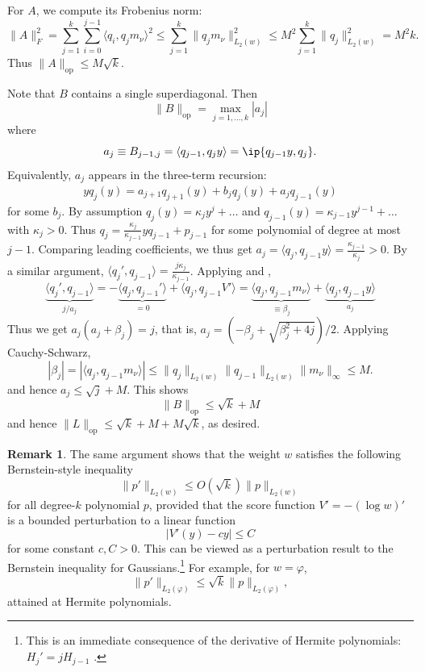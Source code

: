 \documentclass[letterpaper,11pt]{article}
\newcommand{\Iprod}[2]{\langle #1, #2 \rangle}
\theoremstyle{definition}
\newtheorem{remark}{Remark}
\newcommand{\op}{\mathrm{op}}
\begin{document}
    For $A$, we compute its Frobenius norm:
    \[
      \|A\|_F^2=
      \sum_{j=1}^k \sum_{i=0}^{j-1}
      \Iprod{q_i}{q_j m_\nu}^2
      \leq \sum_{j=1}^k \|q_j m_\nu\|_{L_2(w)}^2
      \leq M^2 \sum_{j=1}^k \| {q_j}\|_{L_2(w)}^2 = M^2 k.
    \]
    Thus $\|A\|_{\op} \leq M \sqrt{k}$.

    Note that $B$ contains a single superdiagonal. Then
    \[
      \|B\|_{\op} = \max_{j=1,\ldots,k} |a_j|
    \]
    where
    \[
      a_j \equiv B_{j-1,j} =
      \Iprod{q_{j-1}}{q_j y} = \ip{q_{j-1}y, q_j}.
    \]
    Equivalently, $a_j$ appears in the three-term recursion:
    \begin{align}
      y q_j(y) = a_{j+1} q_{j+1}(y)
      + b_j q_j(y) + a_j q_{j-1}(y)
    \end{align}
    for some $b_j$.
    By assumption
    $q_j(y)=\kappa_j y^j +\ldots$ and $q_{j-1}(y)=\kappa_{j-1} y^{j-1} +\ldots$ with
    $\kappa_j>0$. Thus $q_j = \frac{\kappa_j}{\kappa_{j-1}}y q_{j-1} + p_{j-1}$ for some
    polynomial of degree at most $j-1$.
    Comparing leading coefficients, we thus get
    $a_j =\Iprod{q_j }{q_{j-1} y}
    = \frac{\kappa_{j-1}}{\kappa_j}>0$.
    By a similar argument, $\Iprod{q_j'}{q_{j-1}} = \frac{j\kappa_j}{\kappa_{j-1}}$.
    Applying  and ,
    \[
      \underbrace{\Iprod{q_j'}{q_{j-1}}}_{j/a_j} =
      -\underbrace{\Iprod{q_j}{q_{j-1}'}}_{=0} +
      \Iprod{q_j }{q_{j-1} V'}
      = \underbrace{\Iprod{q_j }{q_{j-1} m_\nu}}_{\equiv \beta_j} + \underbrace{\Iprod{q_j }{q_{j-1}y}}_{a_j}
    \]
    Thus we get
    $a_j(a_j+\beta_j) = j$, that is,
    $a_j = (-\beta_j + \sqrt{\beta_j^2 + 4 j})/2$. Applying Cauchy-Schwarz,
    \[
      |\beta_j| = |\Iprod{q_j }{q_{j-1} m_\nu}| \leq
      \|q_j\|_{L_2(w)} \|q_{j-1}\|_{L_2(w)}
      \|m_\nu\|_\infty \leq M.
    \]
    and hence $a_j \leq \sqrt{j} + M$.
    This shows
    \[
      \|B\|_{\op} \leq \sqrt{k}+M
    \]
    and hence $\|L\|_{\op} \leq \sqrt{k}+M + M\sqrt{k}$, as desired.

    \begin{remark}
    \label{rmk:bernstein-perturb}
      The same argument shows that the weight $w$ satisfies the following Bernstein-style inequality
      \[
        \|p'\|_{L_2(w)}
        \leq O(\sqrt{k}) \|p\|_{L_2(w)}
      \]
      for all
      degree-$k$ polynomial $p$, provided that the score function
      $V'= -(\log w)'$ is a bounded perturbation to a linear function
      \[
        |V'(y) - c y| \leq C
      \]
      for some constant $c,C > 0$.
      This can be viewed as a perturbation result to the Bernstein inequality for Gaussians.\footnote{This is an immediate consequence of the derivative of Hermite polynomials: $H_j'=j H_{j-1}$ \cite{orthogonal.poly}.} For example, for $w=\varphi$,
      \[
        \|p'\|_{L_2(\varphi)}
        \leq \sqrt{k} \|p\|_{L_2(\varphi)},
      \]
      attained at Hermite polynomials.
    \end{remark}
\end{document}
